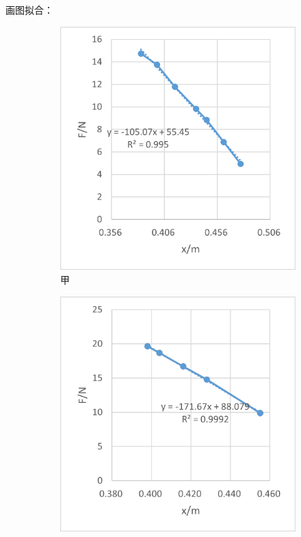 \documentclass[a4paper,zihao=5,UTF8,fontset=fandol]{../phyreport}
\begin{document}
画图拟合：
\begin{figure}[H]
	\centering
	\begin{subfigure}{0.45\textwidth}
		\centering
		\includegraphics[width=\textwidth]{./fig/k105.png}
		\caption{甲}
	\end{subfigure}
	\begin{subfigure}{0.45\textwidth}
		\centering
		\includegraphics[width=\textwidth]{./fig/k171.png}

\end{subfigure}
\end{figure}
\end{document}
